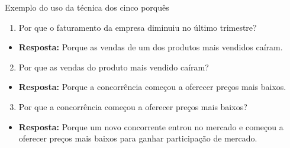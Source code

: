 \documentclass[
  ignorenonframetext,
  aspectratio=169,
]{beamer}
\providecommand{\tightlist}{%
  \setlength{\itemsep}{0pt}\setlength{\parskip}{0pt}}
\begin{document}
\begin{frame}{Exemplo do uso da técnica dos cinco porquês}
\label{exemplo-do-uso-da-tuxe9cnica-dos-cinco-porquuxeas}
\pause

\begin{enumerate}
\tightlist
\item
  Por que o faturamento da empresa diminuiu no último trimestre?
\end{enumerate}

\begin{itemize}
\tightlist
\item
  \textbf{Resposta:} Porque as vendas de um dos produtos mais vendidos
  caíram.
\end{itemize}

\pause

\begin{enumerate}
\setcounter{enumi}{1}
\tightlist
\item
  Por que as vendas do produto mais vendido caíram?
\end{enumerate}

\begin{itemize}
\tightlist
\item
  \textbf{Resposta:} Porque a concorrência começou a oferecer preços
  mais baixos.
\end{itemize}

\pause

\begin{enumerate}
\setcounter{enumi}{2}
\tightlist
\item
  Por que a concorrência começou a oferecer preços mais baixos?
\end{enumerate}

\begin{itemize}
\tightlist
\item
  \textbf{Resposta:} Porque um novo concorrente entrou no mercado e
  começou a oferecer preços mais baixos para ganhar participação de
  mercado.
\end{itemize}
\end{frame}
\end{document}
